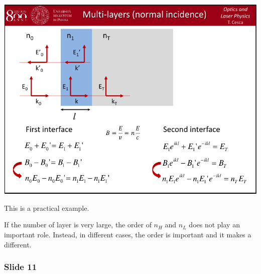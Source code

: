 \documentclass[../main/main.tex]{subfiles}
\begin{document}
\begin{minipage}[]{0.5\linewidth}
\centering
\includegraphics[page=10,width=1\textwidth]{../lessons/pdf_file/06_lecture.pdf}
\end{minipage}
\hspace{0.3cm}\vspace{0.3cm}
\begin{minipage}[c]{0.47\linewidth}

This is a practical example.

If the number of layer is very large, the order of \( n_H \) and \( n_L \) does not play an important role. Instead, in different cases, the order is important and it makes a different.

\end{minipage}

\subsubsection*{Slide 11}
\end{document}

